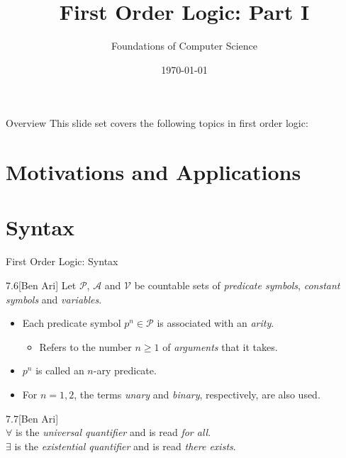 \documentclass[style=sailor,size=12pt]{powerdot}
\title{First Order Logic: Part I}
\author{Foundations of Computer Science}
\date{\today}
\begin{document}
\maketitle
\begin{slide}[toc=,bm=]{Overview}
This slide set covers the following topics in first order logic:

\vspace{5mm}
\tableofcontents[content=sections]
\end{slide}

\section[slide=true]{Motivations and Applications}


\section[slide=true]{Syntax}
\begin{slide}[bm=,toc=]{First Order Logic: Syntax}
\begin{defn}{7.6}[Ben Ari]
Let $\mathcal{P}$, $\mathcal{A}$ and $\mathcal{V}$ be countable sets of
\emph{predicate symbols}, \emph{constant symbols} and \emph{variables}.
\pause
\begin{itemize}
\item Each predicate symbol $p^n \in \mathcal{P}$ is associated with an \emph{arity}.
\begin{itemize}
\item Refers to the number $n \geq 1$ of \emph{arguments} that it takes. 
\end{itemize}
\item $p^n$ is called an $n$-ary predicate. 
\item For $n = 1,2$, the terms \emph{unary} and \emph{binary},
respectively, are also used.
\end{itemize}
\end{defn}
\pause
\begin{defn}{7.7}[Ben Ari]
~\\
$\forall$ is the \emph{universal quantifier} and is read \emph{for all}.\\
$\exists$ is the \emph{existential quantifier} and is read \emph{there exists}.
\end{defn}

\end{slide}
\end{document}
